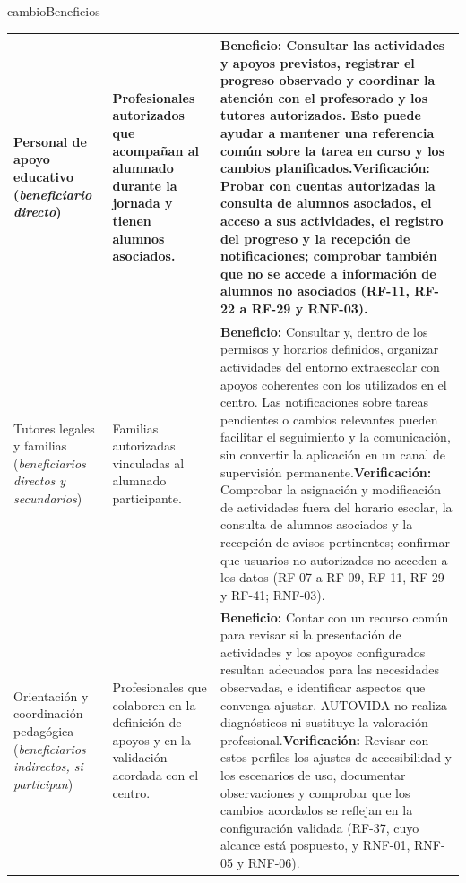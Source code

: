 \begin{cambiocontenido}{cambioBeneficios}
\begin{small}
\begin{longtable}{|>{\raggedright\arraybackslash}p{3.2cm}|>{\raggedright\arraybackslash}p{2.4cm}|>{\raggedright\arraybackslash}p{9.6cm}|}
\hline
Personal de apoyo educativo (\textit{beneficiario directo}) & Profesionales autorizados que acompañan al alumnado durante la jornada y tienen alumnos asociados. & \textbf{Beneficio:} Consultar las actividades y apoyos previstos, registrar el progreso observado y coordinar la atención con el profesorado y los tutores autorizados. Esto puede ayudar a mantener una referencia común sobre la tarea en curso y los cambios planificados.\newline \textbf{Verificación:} Probar con cuentas autorizadas la consulta de alumnos asociados, el acceso a sus actividades, el registro del progreso y la recepción de notificaciones; comprobar también que no se accede a información de alumnos no asociados (RF-11, RF-22 a RF-29 y RNF-03). \\
\hline
Tutores legales y familias (\textit{beneficiarios directos y secundarios}) & Familias autorizadas vinculadas al alumnado participante. & \textbf{Beneficio:} Consultar y, dentro de los permisos y horarios definidos, organizar actividades del entorno extraescolar con apoyos coherentes con los utilizados en el centro. Las notificaciones sobre tareas pendientes o cambios relevantes pueden facilitar el seguimiento y la comunicación, sin convertir la aplicación en un canal de supervisión permanente.\newline \textbf{Verificación:} Comprobar la asignación y modificación de actividades fuera del horario escolar, la consulta de alumnos asociados y la recepción de avisos pertinentes; confirmar que usuarios no autorizados no acceden a los datos (RF-07 a RF-09, RF-11, RF-29 y RF-41; RNF-03). \\
\hline
Orientación y coordinación pedagógica (\textit{beneficiarios indirectos, si participan}) & Profesionales que colaboren en la definición de apoyos y en la validación acordada con el centro. & \textbf{Beneficio:} Contar con un recurso común para revisar si la presentación de actividades y los apoyos configurados resultan adecuados para las necesidades observadas, e identificar aspectos que convenga ajustar. AUTOVIDA no realiza diagnósticos ni sustituye la valoración profesional.\newline \textbf{Verificación:} Revisar con estos perfiles los ajustes de accesibilidad y los escenarios de uso, documentar observaciones y comprobar que los cambios acordados se reflejan en la configuración validada (RF-37, cuyo alcance está pospuesto, y RNF-01, RNF-05 y RNF-06). \\
\hline

\end{longtable}
\end{small}
\end{cambiocontenido}
